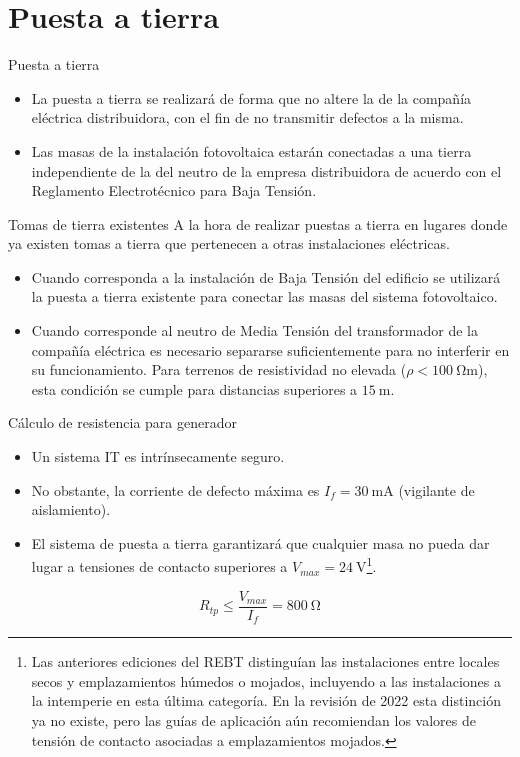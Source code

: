 \documentclass[aspectratio=169, usenames,svgnames,dvipsnames]{beamer}
\begin{document}
\section{Puesta a tierra}
\label{sec:org0d880aa}

\begin{frame}[label={sec:orgb987647}]{Puesta a tierra}
\begin{itemize}
\item \alert{La puesta a tierra} se realizará de forma que \alert{no altere la de la
compañía eléctrica distribuidora}, con el fin de no transmitir
defectos a la misma.

\item \alert{Las masas de la instalación fotovoltaica estarán conectadas a una
tierra independiente de la del neutro} de la empresa distribuidora
de acuerdo con el Reglamento Electrotécnico para Baja Tensión.
\end{itemize}
\end{frame}

\begin{frame}[label={sec:org6517855}]{Tomas de tierra existentes}
A la hora de realizar puestas a tierra en lugares donde ya existen
tomas a tierra que pertenecen a otras instalaciones eléctricas.

\begin{itemize}
\item Cuando corresponda a la \alert{instalación de Baja Tensión del edificio}
\alert{se utilizará la puesta a tierra existente} para conectar las masas
del sistema fotovoltaico.

\item Cuando corresponde al \alert{neutro de Media Tensión del transformador de
la compañía eléctrica} es necesario \alert{separarse suficientemente} para
no interferir en su funcionamiento. Para terrenos de resistividad no
elevada (\(\rho<\SI{100}{\ohm\meter}\)), esta condición se cumple para
distancias superiores a \(\SI{15}{\meter}\).
\end{itemize}
\end{frame}


\begin{frame}[label={sec:orgdb5c64a}]{Cálculo de resistencia para generador}
\begin{itemize}
\item Un sistema IT es intrínsecamente seguro.
\item No obstante, la corriente de defecto máxima es \(I_f=\SI{30}{\milli\ampere}\) (vigilante de aislamiento).
\item El sistema de puesta a tierra garantizará que cualquier masa no pueda dar lugar a tensiones de contacto superiores a \(V_{max}=\SI{24}{\volt}\)\footnote{Las anteriores ediciones del REBT distinguían las instalaciones entre locales secos y emplazamientos húmedos o mojados, incluyendo a las instalaciones a la intemperie en esta última categoría. En la revisión de 2022 esta distinción ya no existe, pero las guías de aplicación aún recomiendan los valores de tensión de contacto asociadas a emplazamientos mojados.}.
\end{itemize}

$$R_{tp}\leq\frac{V_{max}}{I_{f}} = \qty{800}{\ohm}$$
\end{frame}
\end{document}
